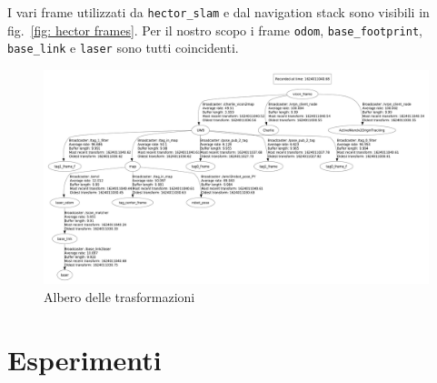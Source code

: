 I vari frame utilizzati da \texttt{hector\_slam} e dal navigation stack sono visibili in fig.~\ref{fig: hector frames}. Per il nostro scopo i frame \texttt{odom}, \texttt{base\_footprint}, \texttt{base\_link} e \texttt{laser} sono tutti coincidenti.


\begin{figure}[]
	\centering
	\includegraphics[width=\linewidth]{tf_tree.pdf}
	\caption{Albero delle trasformazioni}
	\label{fig: rqt_tf_tree}
\end{figure}

\FloatBarrier

\newpage
\section{Esperimenti}

